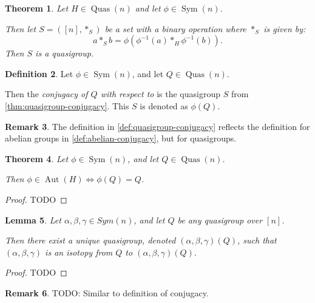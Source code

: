 \documentclass[a4paper, 12pt, english]{article}
\theoremstyle{plain}
\newtheorem{theorem}{Theorem}[section]
\newtheorem{lemma}[theorem]{Lemma}
\theoremstyle{definition}
\newtheorem{definition}[theorem]{Definition}
\newtheorem{remark}[theorem]{Remark}
\newcommand{\tuple}[1]{ \left( #1 \right) } %
\DeclareMathOperator{\Aut}{Aut}
\DeclareMathOperator{\Sym}{Sym}
\DeclareMathOperator{\Quas}{Quas}
\begin{document}
\begin{theorem} \label{thm:quasigroup-conjugacy}
    Let \( H \in \Quas(n) \) and let \( \phi \in \Sym(n) \).

    Then let \( S = \tuple{[n], *_S} \) be a set with a binary operation where \( *_S \) is given by:
    \[
        a *_S b = \phi(\phi^{-1}(a) *_H \phi^{-1}(b)).
    \]
    Then \( S \) is a quasigroup.
\end{theorem}

\begin{definition} \label{def:quasigroup-conjugacy}
    Let \( \phi \in \Sym(n) \), and let \( Q \in \Quas(n) \).

    Then the \emph{conjugacy of \( Q \) with respect to \phi} is the quasigroup \( S \) from \autoref{thm:quasigroup-conjugacy}. This \( S \) is denoted as \( \phi(Q) \).
\end{definition}

\begin{remark}
    The definition in \autoref{def:quasigroup-conjugacy} reflects the definition for abelian groups in \autoref{def:abelian-conjugacy}, but for quasigroups.
\end{remark}

\begin{theorem}
    Let \( \phi \in \Sym(n) \), and let \( Q \in \Quas(n) \).

    Then \( \phi \in \Aut(H) \iff \phi(Q) = Q \).
\end{theorem}
\begin{proof}
    TODO
\end{proof}

\begin{lemma} \label{lemma:isotopy-image}
    Let \( \alpha, \beta, \gamma \in Sym(n) \), and let \( Q \) be any quasigroup over \( [n] \).

    Then there exist a unique quasigroup, denoted \( (\alpha, \beta, \gamma)(Q) \), such that \( (\alpha, \beta, \gamma) \) is an isotopy from \( Q \) to \( (\alpha, \beta, \gamma)(Q) \).
\end{lemma}
\begin{proof}
    TODO
\end{proof}

\begin{remark}
    TODO: Similar to definition of conjugacy.
\end{remark}
\end{document}
